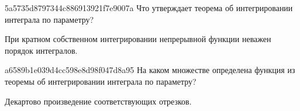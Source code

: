 \begin{note}{5a5735d8797344c886913921f7e9007a}
    Что утверждает теорема об интегрировании интеграла по параметру?

    \begin{cloze}{1}
        При кратном собственном интегрировании непрерывной функции неважен порядок интегралов.
    \end{cloze}
\end{note}

\begin{note}{a6589b1e039d4cc598e8d98f047d8a95}
    На каком множестве определена функция из теоремы об интегрировании интеграла по параметру?

    \begin{cloze}{1}
        Декартово произведение соответствующих отрезков.
    \end{cloze}
\end{note}


